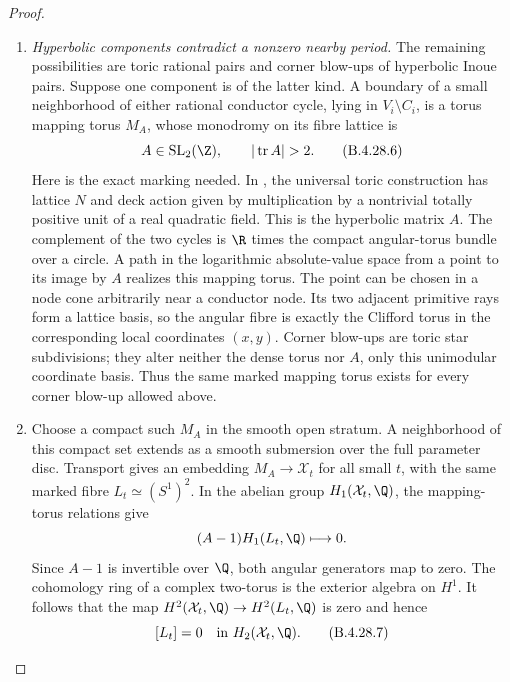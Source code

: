 \begin{proof}
\begin{enumerate}[label=\arabic*.,leftmargin=*]
\item \emph{Hyperbolic components contradict a nonzero nearby period.}
The remaining possibilities are toric rational pairs
and corner blow-ups of hyperbolic Inoue pairs. Suppose
one component is of the latter kind. A boundary of a
small neighborhood of either rational conductor cycle,
lying in $V_i\setminus C_i$, is a torus mapping torus
$M_A$, whose monodromy on its fibre lattice is
\[
 A\in\operatorname{SL}_2(\Z),\qquad
 |\operatorname{tr}A|>2.                             \tag{B.4.28.6}
\]
Here is the exact marking needed. In
\citet[Section 15, Theorem 15.1 and the following
paragraph, pp.~130--131]{Oda1978D}, the universal
toric construction has lattice $N$ and deck action
given by multiplication by a nontrivial totally
positive unit of a real quadratic field. This is
the hyperbolic matrix $A$. The complement of the
two cycles is $\R$ times the compact angular-torus
bundle over a circle. A path in the logarithmic
absolute-value space from a point to its image by
$A$ realizes this mapping torus. The point can be
chosen in a node cone arbitrarily near a conductor
node. Its two adjacent primitive rays form a lattice
basis, so the angular fibre is exactly the Clifford
torus in the corresponding local coordinates
$(x,y)$. Corner blow-ups are toric star subdivisions;
they alter neither the dense torus nor $A$, only
this unimodular coordinate basis. Thus the same
marked mapping torus exists for every corner
blow-up allowed above.

\item Choose a compact such $M_A$ in the smooth open stratum.
A neighborhood of this compact set extends as a
smooth submersion over the full parameter disc.
Transport gives an embedding $M_A\to\mathcal X_t$ for
all small $t$, with the same marked fibre $L_t\simeq
(S^1)^2$. In the abelian group
$H_1(\mathcal X_t,\Q)$, the mapping-torus relations give
\[
 (A-1)H_1(L_t,\Q)\longmapsto0.
\]
Since $A-1$ is invertible over $\Q$, both angular
generators map to zero. The cohomology ring of a
complex two-torus is the exterior algebra on $H^1$.
It follows that the map $H^2(\mathcal X_t,\Q)\to
H^2(L_t,\Q)$ is zero and hence
\[
 [L_t]=0\quad\hbox{in }H_2(\mathcal X_t,\Q).           \tag{B.4.28.7}
\]


\end{enumerate}
\end{proof}
